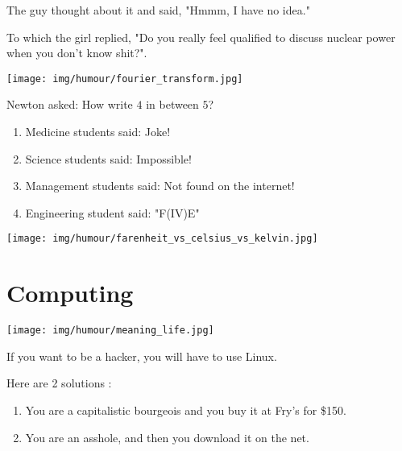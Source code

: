 The guy thought about it and said, "Hmmm, I have no idea."

To which the girl replied, "Do you really feel qualified to discuss nuclear power when you don't know shit?".

\begin{center}\underline{\hspace{5 cm}}\end{center}

	\begin{center}
	\texttt{[image: img/humour/fourier\_transform.jpg]}
	\end{center}
	
\begin{center}\underline{\hspace{5 cm}}\end{center}

Newton asked: How write $4$ in between $5$?

\begin{enumerate}
	\item Medicine students said: Joke!
	
	\item Science students said: Impossible!
	
	\item Management students said: Not found on the internet!
	
	\item Engineering student said: "F(IV)E"
\end{enumerate}

	\begin{center}
	\texttt{[image: img/humour/farenheit\_vs\_celsius\_vs\_kelvin.jpg]}
	\end{center}

	\pagebreak
	\section{Computing}

	\begin{center}
	\texttt{[image: img/humour/meaning\_life.jpg]}
	\end{center}
\begin{center}\underline{\hspace{5 cm}}\end{center}	

If you want to be a hacker, you will have to use Linux.

Here are 2 solutions :
\begin{enumerate}
	\item You are a capitalistic bourgeois and you buy it at Fry's for \$150.
	\item You are an asshole, and then you download it on the net.
\end{enumerate}

